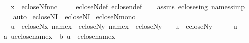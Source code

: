 \begin{isabellebody}
\ \ \ {\isachardoublequoteopen}x\ {\isasymin}\ ecloseN{\isacharparenleft}{\kern0pt}{\isasymlangle}f{\isacharcomma}{\kern0pt}n{}{\isacharcomma}{\kern0pt}n{}{\isacharcomma}{\kern0pt}c{\isasymrangle}{\isacharparenright}{\kern0pt}{\isachardoublequoteclose}\ \isanewline
%
\isadelimproof
\ \ %
\endisadelimproof
%
\isatagproof
{}\isamarkupfalse%
\ ecloseN{\isacharunderscore}{\kern0pt}def\ eclose{\isacharunderscore}{\kern0pt}n{\isacharunderscore}{\kern0pt}def\isanewline
\ \ \isamarkupfalse%
\ assms\ eclose{\isacharunderscore}{\kern0pt}sing\ names{\isacharunderscore}{\kern0pt}simp\isanewline
\ \ \isamarkupfalse%
\ auto%
\endisatagproof
{\isafoldproof}%
%
\isadelimproof
\isanewline
%
\endisadelimproof
\isanewline
{}\isamarkupfalse%
\ ecloseNI\ {\isacharequal}{\kern0pt}\ ecloseNI{}\isanewline
\isanewline
{}\isamarkupfalse%
\ ecloseN{\isacharunderscore}{\kern0pt}mono\ {\isacharcolon}{\kern0pt}\isanewline
\ \ \ {\isachardoublequoteopen}u\ {\isasymin}\ ecloseN{\isacharparenleft}{\kern0pt}x{\isacharparenright}{\kern0pt}{\isachardoublequoteclose}\ {\isachardoublequoteopen}name{}{\isacharparenleft}{\kern0pt}x{\isacharparenright}{\kern0pt}\ {\isasymin}\ ecloseN{\isacharparenleft}{\kern0pt}y{\isacharparenright}{\kern0pt}{\isachardoublequoteclose}\ {\isachardoublequoteopen}name{}{\isacharparenleft}{\kern0pt}x{\isacharparenright}{\kern0pt}\ {\isasymin}\ ecloseN{\isacharparenleft}{\kern0pt}y{\isacharparenright}{\kern0pt}{\isachardoublequoteclose}\isanewline
\ \ \ {\isachardoublequoteopen}u\ {\isasymin}\ ecloseN{\isacharparenleft}{\kern0pt}y{\isacharparenright}{\kern0pt}{\isachardoublequoteclose}\isanewline
%
\isadelimproof
%
\endisadelimproof
%
\isatagproof
{}\isamarkupfalse%
\ {\isacharminus}{\kern0pt}\isanewline
\ \ \isamarkupfalse%
\ {\isacartoucheopen}u{\isasymin}{\isacharunderscore}{\kern0pt}{\isacartoucheclose}\isanewline
\ \ \isamarkupfalse%
\ {\isacharparenleft}{\kern0pt}a{\isacharparenright}{\kern0pt}\ {\isachardoublequoteopen}u{\isasymin}eclose{\isacharparenleft}{\kern0pt}{\isacharbraceleft}{\kern0pt}name{}{\isacharparenleft}{\kern0pt}x{\isacharparenright}{\kern0pt}{\isacharbraceright}{\kern0pt}{\isacharparenright}{\kern0pt}{\isachardoublequoteclose}\ {\isacharbar}{\kern0pt}\ {\isacharparenleft}{\kern0pt}b{\isacharparenright}{\kern0pt}\ {\isachardoublequoteopen}u\ {\isasymin}\ eclose{\isacharparenleft}{\kern0pt}{\isacharbraceleft}{\kern0pt}name{}{\isacharparenleft}{\kern0pt}x{\isacharparenright}{\kern0pt}{\isacharbraceright}{\kern0pt}{\isacharparenright}{\kern0pt}{\isachardoublequoteclose}\isanewline

\end{isabellebody}
